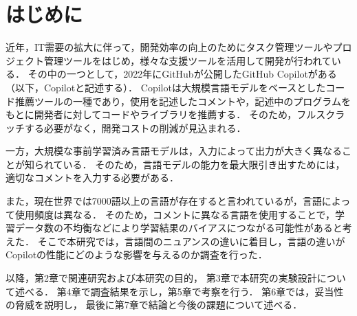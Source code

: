 \section{はじめに\label{intro}}
    近年，IT需要の拡大に伴って，開発効率の向上のためにタスク管理ツールやプロジェクト管理ツールをはじめ，様々な支援ツールを活用して開発が行われている．
    その中の一つとして，2022年にGitHubが公開したGitHub Copilotがある（以下，Copilotと記述する）．
    Copilotは大規模言語モデルをベースとしたコード推薦ツールの一種であり，使用を記述したコメントや，記述中のプログラムをもとに開発者に対してコードやライブラリを推薦する．
    そのため，フルスクラッチする必要がなく，開発コストの削減が見込まれる．

    一方，大規模な事前学習済み言語モデルは，入力によって出力が大きく異なることが知られている．
    そのため，言語モデルの能力を最大限引き出すためには，適切なコメントを入力する必要がある．
    
    また，現在世界では7000語以上の言語が存在すると言われているが，言語によって使用頻度は異なる．
    そのため，コメントに異なる言語を使用することで，学習データ数の不均衡などにより学習結果のバイアスにつながる可能性があると考えた．
    そこで本研究では，言語間のニュアンスの違いに着目し，言語の違いがCopilotの性能にどのような影響を与えるのか調査を行った．

    以降，第2章で関連研究および本研究の目的，
    第3章で本研究の実験設計について述べる．
    第4章で調査結果を示し，第5章で考察を行う．
    第6章では，妥当性の脅威を説明し，
    最後に第7章で結論と今後の課題について述べる．
